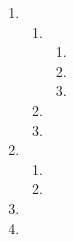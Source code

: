 \begin{enumerate}[itemsep=5pt, label=\textbf{\arabic*}. ]
\begin{enumerate}[noitemsep, label=\textbf{(\alph*)} ]
\begin{enumerate}
      \item %
      \item %
      \end{enumerate} 
    \item %
    \end{enumerate}
  \item %
    \begin{enumerate}[noitemsep, label=\textbf{(\alph*)} ]
\item %
      \begin{enumerate}
      \item %
      \item %
      \item %
      \end{enumerate}
    \item %
    \item %
    \end{enumerate}
\item %
    \begin{enumerate}[noitemsep, label=\textbf{(\alph*)} ]
    \item %
    \item %
    \end{enumerate}
\item %
\item %

\end{enumerate}

